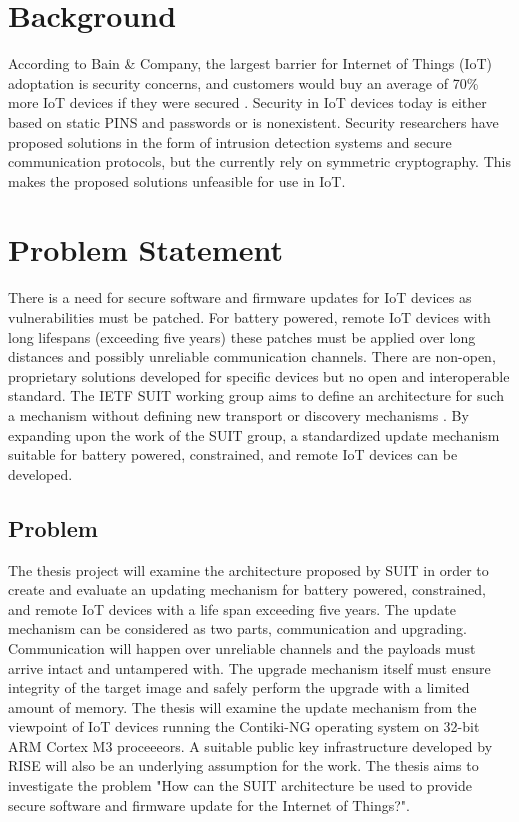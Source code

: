\documentclass[0-thesis.tex]{subfiles}
\begin{document}
\section{Background}

According to Bain \& Company, the largest barrier for Internet of Things (IoT) adoptation is security concerns,
and customers would buy an average of 70\% more IoT devices if they were secured \parencite{ali_bosche_ford_2018}. 
Security in IoT devices today is either based on static PINS and passwords or is nonexistent. Security 
researchers have proposed solutions in the form of intrusion detection systems and secure 
communication protocols, but the currently rely on symmetric cryptography. This makes the 
proposed solutions unfeasible for use in IoT. 

\section{Problem Statement}
There is a need for secure software and firmware updates for IoT devices as vulnerabilities 
must be patched. For battery powered, remote IoT devices with long lifespans (exceeding five years) 
these patches must be applied over long distances and possibly unreliable communication channels.
There are non-open, proprietary solutions developed for specific devices but no open and 
interoperable standard. The IETF SUIT working group aims to define an architecture for such a 
mechanism without defining new transport or discovery mechanisms \parencite{suit}. By expanding upon the work of 
the SUIT group, a standardized update mechanism suitable for battery powered, constrained, and remote 
IoT devices can be developed.

\subsection{Problem}
The thesis project will examine the architecture proposed by SUIT in order to create and evaluate an 
updating mechanism for battery powered, constrained, and remote IoT devices with a life span 
exceeding five years. The update mechanism can be considered as two parts, communication and upgrading.
Communication will happen over unreliable channels and the payloads must arrive intact and untampered 
with. The upgrade mechanism itself must ensure integrity of the target image and safely perform the 
upgrade with a limited amount of memory. The thesis will examine the update mechanism from the viewpoint 
of IoT devices running the Contiki-NG operating system on 32-bit ARM Cortex M3 proceeeors. A suitable 
public key infrastructure developed by RISE will also be an underlying assumption for the work. The thesis 
aims to investigate the problem "How can the SUIT architecture be used to provide secure software and firmware 
update for the Internet of Things?".
\end{document}
